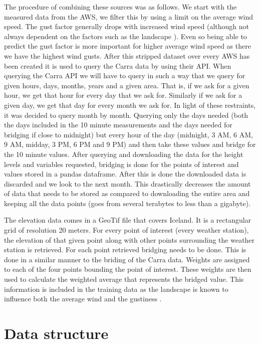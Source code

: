 The procedure of combining these sources was as follows. We start with the measured data from the AWS, we filter this by using a limit on the average wind speed. The gust factor generally drops with increased wind speed (although not always dependent on the factors such as the landscape \cite{GNP_vidtal}). Even so being able to predict the gust factor is more important for higher average wind speed as there we have the highest wind gusts. After this stripped dataset over every AWS has been created it is used to query the Carra data by using their API. When querying the Carra API we will have to query in such a way that we query for given hours, days, months, years and a given area. That is, if we ask for a given hour, we get that hour for every day that we ask for. Similarly if we ask for a given day, we get that day for every month we ask for. In light of these restraints, it was decided to query month by month. Querying only the days needed (both the days included in the 10 minute measurements and the days needed for bridging if close to midnight) but every hour of the day (midnight, 3 AM, 6 AM, 9 AM, midday, 3 PM, 6 PM and 9 PM) and then take these values and bridge for the 10 minute values. After querying and downloading the data for the height levels and variables requested, bridging is done for the points of interest and values stored in a pandas dataframe. After this is done the downloaded data is discarded and we look to the next month. This drastically decreases the amount of data that needs to be stored as compared to downloading the entire area and keeping all the data points (goes from several terabytes to less than a gigabyte).

The elevation data comes in a GeoTif file that covers Iceland. It is a rectangular grid of resolution 20 meters. For every point of interest (every weather station), the elevation of that given point along with other points surrounding the weather station is retrieved. For each point retrieved bridging needs to be done. This is done in a similar manner to the briding of the Carra data. Weights are assigned to each of the four points bounding the point of interest. These weights are then used to calculate the weighted average that represents the bridged value. This information is included in the training data as the landscape is known to influence both the average wind and the gustiness \cite{GNP_vidtal}. 


\section{Data structure}

